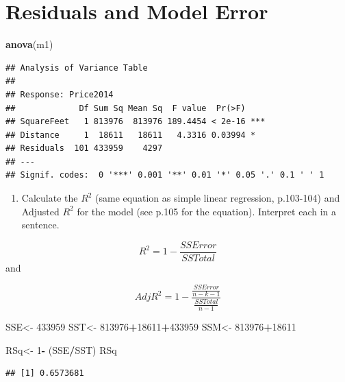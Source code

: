 \documentclass[]{article}
\newenvironment{Shaded}{\begin{snugshade}}{\end{snugshade}}
\newcommand{\DecValTok}[1]{\textcolor[rgb]{0.00,0.00,0.81}{#1}}
\newcommand{\KeywordTok}[1]{\textcolor[rgb]{0.13,0.29,0.53}{\textbf{#1}}}
\newcommand{\NormalTok}[1]{#1}
\newcommand{\OperatorTok}[1]{\textcolor[rgb]{0.81,0.36,0.00}{\textbf{#1}}}
\newcommand{\StringTok}[1]{\textcolor[rgb]{0.31,0.60,0.02}{#1}}
\providecommand{\tightlist}{%
  \setlength{\itemsep}{0pt}\setlength{\parskip}{0pt}}
\begin{document}
\newpage

\hypertarget{residuals-and-model-error}{%
\section{Residuals and Model Error}\label{residuals-and-model-error}}

\begin{Shaded}
\begin{Highlighting}[]
\KeywordTok{anova}\NormalTok{(m1)}
\end{Highlighting}
\end{Shaded}

\begin{verbatim}
## Analysis of Variance Table
## 
## Response: Price2014
##             Df Sum Sq Mean Sq  F value  Pr(>F)    
## SquareFeet   1 813976  813976 189.4454 < 2e-16 ***
## Distance     1  18611   18611   4.3316 0.03994 *  
## Residuals  101 433959    4297                     
## ---
## Signif. codes:  0 '***' 0.001 '**' 0.01 '*' 0.05 '.' 0.1 ' ' 1
\end{verbatim}

\begin{enumerate}
\def\labelenumi{\arabic{enumi}.}
\tightlist
\item
  Calculate the \(R^2\) (same equation as simple linear regression,
  p.103-104) and Adjusted \(R^2\) for the model (see p.105 for the
  equation). Interpret each in a sentence.
\end{enumerate}

\[ R^2 = 1 - \frac{SSError}{SSTotal} \] and

\[ AdjR^2 = 1 - \frac{\frac{SSError}{n-k-1}}{\frac{SSTotal}{n-1}} \]

\begin{Shaded}
\begin{Highlighting}[]
\NormalTok{SSE<-}\StringTok{ }\DecValTok{433959}
\NormalTok{SST<-}\StringTok{ }\DecValTok{813976}\OperatorTok{+}\DecValTok{18611}\OperatorTok{+}\DecValTok{433959}
\NormalTok{SSM<-}\StringTok{ }\DecValTok{813976}\OperatorTok{+}\DecValTok{18611}

\NormalTok{RSq<-}\StringTok{ }\DecValTok{1}\OperatorTok{-}\StringTok{ }\NormalTok{(SSE}\OperatorTok{/}\NormalTok{SST)}
\NormalTok{RSq}
\end{Highlighting}
\end{Shaded}

\begin{verbatim}
## [1] 0.6573681
\end{verbatim}
\end{document}
